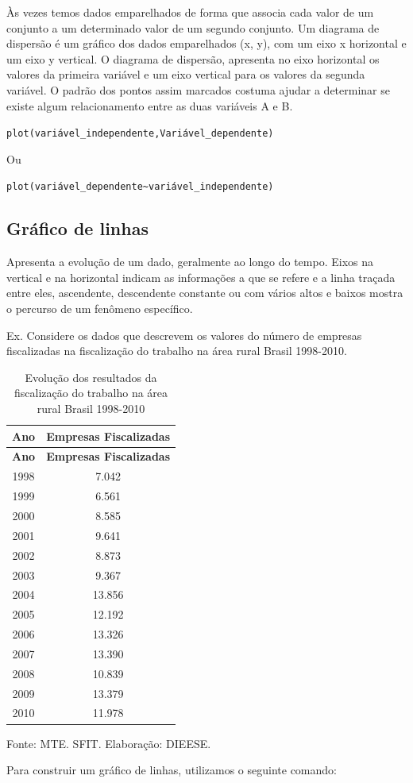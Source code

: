 \documentclass[12pt,brazil,oneside]{book}
\begin{document}
Às vezes temos dados emparelhados de forma que associa cada valor de um conjunto a um determinado valor de um segundo conjunto. Um diagrama de dispersão é um gráfico dos dados emparelhados (x, y), com um eixo x horizontal e um eixo y vertical. O diagrama de dispersão, apresenta no eixo horizontal os valores da primeira variável e um eixo vertical para os valores da segunda variável. O padrão dos pontos assim marcados costuma ajudar a determinar se existe algum relacionamento entre as duas variáveis A e B.

\texttt{plot(variável\_independente,Variável\_dependente)}

Ou

\texttt{plot(variável\_dependente\textasciitilde{}variável\_independente)}

\hypertarget{grafico-de-linhas}{%
\subsection{Gráfico de linhas}\label{grafico-de-linhas}}

Apresenta a evolução de um dado, geralmente ao longo do tempo. Eixos na vertical e na horizontal indicam as informações a que se refere e a linha traçada entre eles, ascendente, descendente constante ou com vários altos e baixos mostra o percurso de um fenômeno específico.

Ex. Considere os dados que descrevem os valores do número de empresas fiscalizadas na fiscalização do trabalho na área rural Brasil 1998-2010.

\begin{longtable}[]{@{}cc@{}}
\caption{\label{tab:evolres}Evolução dos resultados da fiscalização do trabalho na área rural Brasil 1998-2010}\tabularnewline
\toprule
\textbf{Ano} & \textbf{Empresas Fiscalizadas}\tabularnewline
\midrule
\endfirsthead
\toprule
\textbf{Ano} & \textbf{Empresas Fiscalizadas}\tabularnewline
\midrule
\endhead
1998 & 7.042\tabularnewline
1999 & 6.561\tabularnewline
2000 & 8.585\tabularnewline
2001 & 9.641\tabularnewline
2002 & 8.873\tabularnewline
2003 & 9.367\tabularnewline
2004 & 13.856\tabularnewline
2005 & 12.192\tabularnewline
2006 & 13.326\tabularnewline
2007 & 13.390\tabularnewline
2008 & 10.839\tabularnewline
2009 & 13.379\tabularnewline
2010 & 11.978\tabularnewline
\bottomrule
\end{longtable}

Fonte: MTE. SFIT. Elaboração: DIEESE.

Para construir um gráfico de linhas, utilizamos o seguinte comando:
\end{document}
